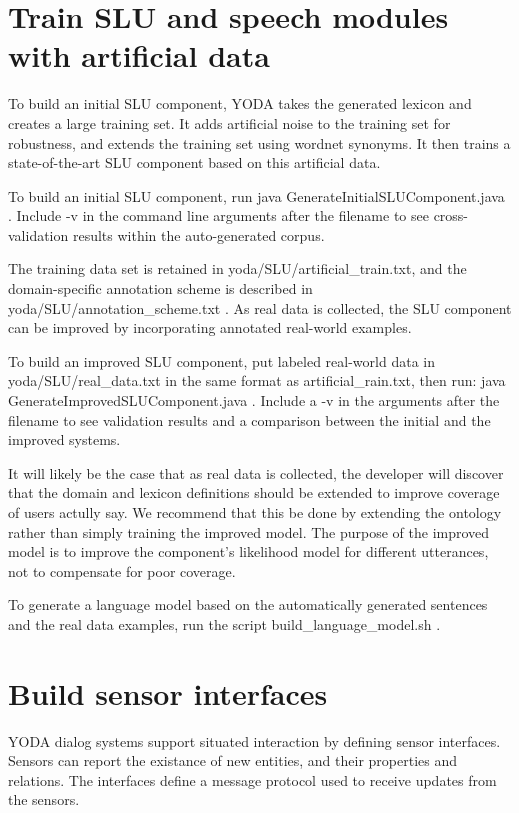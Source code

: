 \documentclass[10pt]{article}
\begin{document}
\section {Train SLU and speech modules with artificial data}

To build an initial SLU component, YODA takes the generated lexicon and creates a large training set.
It adds artificial noise to the training set for robustness, and extends the training set using wordnet synonyms.
It then trains a state-of-the-art SLU component based on this artificial data.

To build an initial SLU component, run java GenerateInitialSLUComponent.java .
Include -v in the command line arguments after the filename to see cross-validation results within the auto-generated corpus.

The training data set is retained in yoda/SLU/artificial\_train.txt, and the domain-specific annotation scheme is described in yoda/SLU/annotation\_scheme.txt .
As real data is collected, the SLU component can be improved by incorporating annotated real-world examples.

To build an improved SLU component, put labeled real-world data in yoda/SLU/real\_data.txt in the same format as artificial\_rain.txt, then run: java GenerateImprovedSLUComponent.java .
Include a -v in the arguments after the filename to see validation results and a comparison between the initial and the improved systems.

It will likely be the case that as real data is collected, the developer will discover that the domain and lexicon definitions should be extended to improve coverage of users actully say.
We recommend that this be done by extending the ontology rather than simply training the improved model.
The purpose of the improved model is to improve the component's likelihood model for different utterances, not to compensate for poor coverage.

To generate a language model based on the automatically generated sentences and the real data examples, run the script build\_language\_model.sh .


\section {Build sensor interfaces}
YODA dialog systems support situated interaction by defining sensor interfaces.
Sensors can report the existance of new entities, and their properties and relations.
The interfaces define a message protocol used to receive updates from the sensors.
\end{document}
